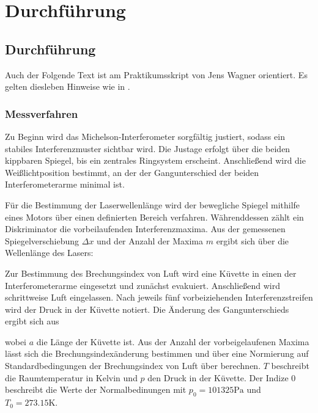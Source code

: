 \chapter{Durchführung} \label{ch:Durchfuehrung}

\section{Durchführung} \label{sec:Durchfuhrung}

Auch der Folgende Text ist am Praktikumsskript von Jens Wagner orientiert. Es gelten diesleben Hinweise wie in \cite{skriptPAP21,Duden}.

\subsection{Messverfahren}
\label{sec:Messverfahren}

Zu Beginn wird das Michelson-Interferometer sorgfältig justiert, sodass ein stabiles Interferenzmuster sichtbar wird. Die Justage erfolgt über die beiden kippbaren Spiegel, bis ein zentrales Ringsystem erscheint. Anschließend wird die Weißlichtposition bestimmt, an der der Gangunterschied der beiden Interferometerarme minimal ist.  

Für die Bestimmung der Laserwellenlänge wird der bewegliche Spiegel mithilfe eines Motors über einen definierten Bereich verfahren. Währenddessen zählt ein Diskriminator die vorbeilaufenden Interferenzmaxima. Aus der gemessenen Spiegelverschiebung \(\Delta x\) und der Anzahl der Maxima \(m\) ergibt sich über  die Wellenlänge des Lasers:



Zur Bestimmung des Brechungsindex von Luft wird eine Küvette in einen der Interferometerarme eingesetzt und zunächst evakuiert. Anschließend wird schrittweise Luft eingelassen. Nach jeweils fünf vorbeiziehenden Interferenzstreifen wird der Druck in der Küvette notiert. Die Änderung des Gangunterschieds ergibt sich aus



wobei \(a\) die Länge der Küvette ist. Aus der Anzahl der vorbeigelaufenen Maxima lässt sich die Brechungsindexänderung bestimmen und über eine Normierung auf Standardbedingungen der Brechungsindex von Luft über 
berechnen. $T$ beschreibt die Raumtemperatur in Kelvin und $p$ den Druck in der Küvette. Der Indize $0$ beschreibt die Werte der Normalbedinungen mit $p_0 = 101325 \mathrm{Pa}$ und $T_0 = 273.15 \mathrm{K}$.

